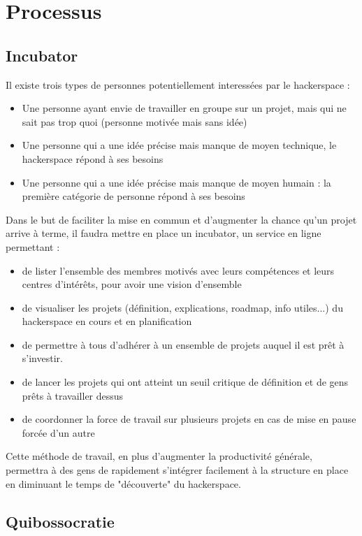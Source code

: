 \documentclass{article}
\begin{document}
\section{Processus}
\subsection{Incubator}

Il existe trois types de personnes potentiellement interessées par le hackerspace :
\begin{itemize}
\item Une personne ayant envie de travailler en groupe sur un projet, mais qui ne 
sait pas trop quoi (personne motivée mais sans idée)
\item Une personne qui a une idée précise mais manque de moyen technique, 
le hackerspace répond à ses besoins
\item Une personne qui a une idée précise mais manque de moyen humain : 
la première catégorie de personne répond à ses besoins
\end{itemize}

Dans le but de faciliter la mise en commun et d'augmenter la chance qu'un projet 
arrive à terme, il faudra mettre en place un incubator, un service en ligne permettant :
\begin{itemize}
\item de lister l'ensemble des membres motivés avec leurs compétences et leurs 
centres d'intérêts, pour avoir une vision d'ensemble
\item de visualiser les projets (définition, explications, roadmap, info utiles...) 
du hackerspace en cours et en planification
\item de permettre à tous d'adhérer à un ensemble de projets auquel il est prêt à s'investir.
\item de lancer les projets qui ont atteint un seuil critique de définition et 
de gens prêts à travailler dessus
\item de coordonner la force de travail sur plusieurs projets en cas de mise en pause forcée d'un autre
\end{itemize}

Cette méthode de travail, en plus d'augmenter la productivité générale, permettra 
à des gens de rapidement s'intégrer facilement à la structure en place en diminuant 
le temps de "découverte" du hackerspace.

\subsection{Quibossocratie}
\end{document}
